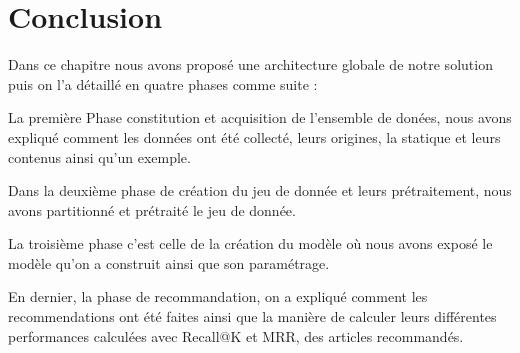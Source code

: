 \section{Conclusion}
\par Dans ce chapitre nous avons proposé une architecture globale de notre solution puis on l’a détaillé en quatre phases comme suite :

\par La première Phase constitution et acquisition de l'ensemble de donées, nous avons expliqué comment les données ont été collecté, leurs origines, la statique et leurs contenus ainsi qu'un exemple. 

\par Dans la deuxième phase de création du jeu de donnée et leurs prétraitement, nous avons partitionné et prétraité le jeu de donnée. 

\par La troisième phase c'est celle de la création du modèle où nous avons exposé le modèle qu'on a construit ainsi que son paramétrage.

\par En dernier, la phase de recommandation, on a expliqué comment les recommendations ont été faites ainsi que la manière de calculer leurs différentes performances calculées avec Recall@K et MRR, des articles recommandés.  
